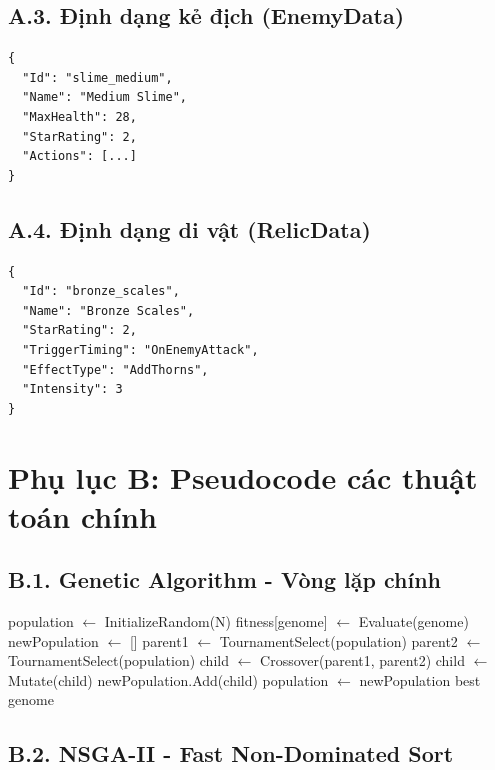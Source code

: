 \subsection*{A.3. Định dạng kẻ địch (EnemyData)}

\begin{verbatim}
{
  "Id": "slime_medium",
  "Name": "Medium Slime",  
  "MaxHealth": 28,
  "StarRating": 2,
  "Actions": [...]
}
\end{verbatim}

\subsection*{A.4. Định dạng di vật (RelicData)}

\begin{verbatim}
{
  "Id": "bronze_scales",
  "Name": "Bronze Scales",
  "StarRating": 2,
  "TriggerTiming": "OnEnemyAttack",
  "EffectType": "AddThorns",
  "Intensity": 3
}
\end{verbatim}

\section*{Phụ lục B: Pseudocode các thuật toán chính}

\subsection*{B.1. Genetic Algorithm - Vòng lặp chính}

\begin{algorithm}[H]
\caption{Thuật toán GA đơn giản}
\begin{algorithmic}[1]
\State population $\gets$ InitializeRandom(N)
        \State fitness[genome] $\gets$ Evaluate(genome)
    \EndFor
    \State newPopulation $\gets$ []
        \State parent1 $\gets$ TournamentSelect(population)
        \State parent2 $\gets$ TournamentSelect(population)
        \State child $\gets$ Crossover(parent1, parent2)
        \State child $\gets$ Mutate(child)
        \State newPopulation.Add(child)
    \EndWhile
    \State population $\gets$ newPopulation
\EndFor
\State \Return best genome
\end{algorithmic}
\end{algorithm}

\subsection*{B.2. NSGA-II - Fast Non-Dominated Sort}

